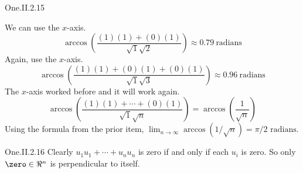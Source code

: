 \begin{ans}{One.II.2.15}
      \begin{exparts}
        \partsitem We can use the \( x \)-axis.
          \begin{equation*}
            \arccos (\frac{(1)(1)+(0)(1)}{\sqrt{1}\sqrt{2}})
            \approx 0.79~\text{radians}
          \end{equation*}
        \partsitem Again, use the \( x \)-axis.
          \begin{equation*}
            \arccos (\frac{(1)(1)+(0)(1)+(0)(1)}{\sqrt{1}\sqrt{3}})
            \approx 0.96~\text{radians}
          \end{equation*}
        \partsitem The \( x \)-axis worked before and it will work again.
          \begin{equation*}
            \arccos (\frac{(1)(1)+\cdots+(0)(1)}{\sqrt{1}\sqrt{n}})
            =\arccos (\frac{1}{\sqrt{n}})
          \end{equation*}
        \partsitem Using the formula from the prior item,
            $\lim_{n\to\infty} \arccos(1/\sqrt{n})
              =\pi/2\text{\ radians}$.
      \end{exparts}
    
\end{ans}
\begin{ans}{One.II.2.16}
      Clearly \( u_1u_1+\cdots+u_nu_n \) is zero if and only if
      each \( u_i \) is zero.
      So only \( \zero\in\Re^n \) is perpendicular to itself.
    
\end{ans}

